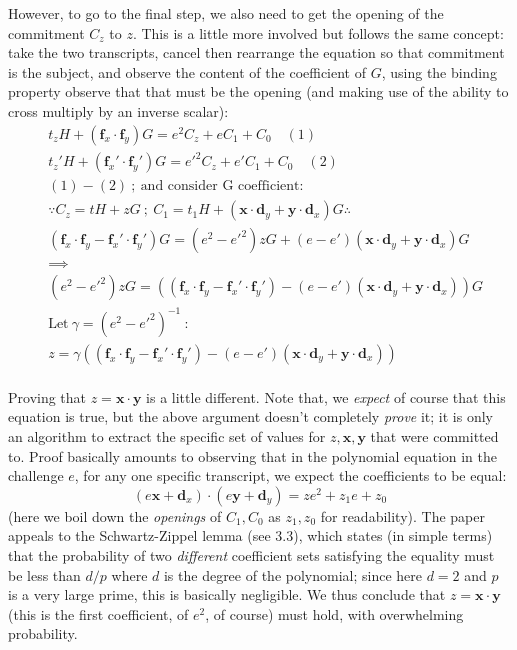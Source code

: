 \documentclass[10pt,a4paper]{article}
\begin{document}
However, to go to the final step, we also need to get the opening of the
commitment $C_z$ to $z$. This is a little more involved but follows the same
concept: take the two transcripts, cancel then rearrange the equation so
that commitment is the subject, and observe the content of the
coefficient of $G$, using the binding property observe that that must be
the opening (and making use of the ability to cross multiply by an
inverse scalar):
\begin{align*}
& t_z H + \left(\textbf{f}_x \cdot \textbf{f}_y \right) G = e^2 C_z + e C_1 + C_0 \quad (1) \\
& t_z' H + \left(\textbf{f}_x' \cdot \textbf{f}_y' \right) G = e'^2 C_z + e' C_1 + C_0  \quad (2)\\
& (1) - (2) \ ;\ \textrm{and consider G coefficient}: \\
& \because C_z = tH + zG\ ;\ C_1 = t_1 H + \left(\textbf{x} \cdot \textbf{d}_y + 
\textbf{y} \cdot \textbf{d}_x \right)G \therefore \\
&  \left(\textbf{f}_x \cdot \textbf{f}_y - \textbf{f}_x' \cdot \textbf{f}_y'\right) G = 
\left(e^2 - e'^2\right)zG + \left(e-e'\right)\left(\textbf{x} \cdot \textbf{d}_y + 
\textbf{y} \cdot \textbf{d}_x \right)G \\
& \implies \\
& \left(e^2 - e'^2\right)zG = \left(\left(\textbf{f}_x \cdot \textbf{f}_y - 
\textbf{f}_x' \cdot \textbf{f}_y'\right) -  \left(e-e'\right)\left(\textbf{x} \cdot \textbf{d}_y + 
\textbf{y} \cdot \textbf{d}_x \right)\right) G \\
& \textrm{Let}\ \gamma = \left(e^2 - e'^2\right)^{-1}\ : \\
& z = \gamma\left(\left(\textbf{f}_x \cdot \textbf{f}_y - 
\textbf{f}_x' \cdot \textbf{f}_y'\right) -  \left(e-e'\right)\left(\textbf{x} \cdot \textbf{d}_y + 
\textbf{y} \cdot \textbf{d}_x \right)\right) \\
\end{align*}

Proving that $z = \mathbf{x}\cdot\mathbf{y}$ is a little different. Note that, we \emph{expect} of
course that this equation is true, but the above argument doesn't
completely \emph{prove} it; it is only an algorithm to extract the
specific set of values for $z, \mathbf{x}, \mathbf{y}$ that were committed to. Proof basically amounts to observing that
in the polynomial equation in the challenge $e$, for any one specific
transcript, we expect the coefficients to be equal:
\[(e\textbf{x} + \textbf{d}_x) \cdot (e\textbf{y} + \textbf{d}_y) = z e^2 +  z_1 e + z_0\]
(here we boil down the \emph{openings }of $C_1, C_0$ as $z_1, z_0$ for readability). The paper
appeals to the Schwartz-Zippel lemma (see 3.3), which states (in simple
terms) that the probability of two \emph{different} coefficient sets
satisfying the equality must be less than $d/p$ where $d$ is the degree of the
polynomial; since here $d=2$ and $p$ is a very large prime, this is basically
negligible. We thus conclude that $z=\mathbf{x}\cdot \mathbf{y}$ (this is the first coefficient, of $e^2$,
of course) must hold, with overwhelming probability.
\end{document}
